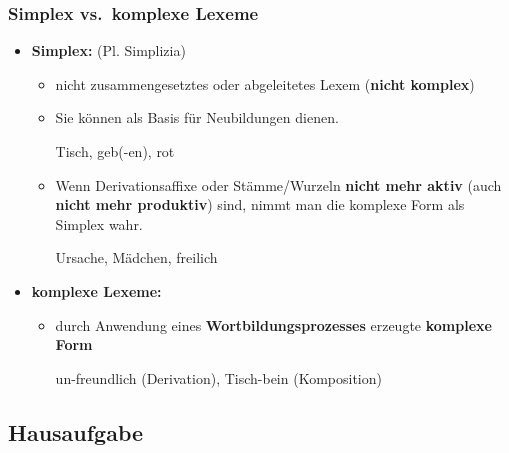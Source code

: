 \begin{frame}
\frametitle{Simplex vs.\ komplexe Lexeme}

\begin{itemize}
	\item \textbf{Simplex:} (Pl. Simplizia)
	
	\begin{itemize}
		\item nicht zusammengesetztes oder abgeleitetes Lexem (\textbf{nicht komplex})
		\item Sie können als Basis für Neubildungen dienen.
		
		\ea Tisch, geb(-en), rot
		\z 
		
		\item Wenn Derivationsaffixe oder Stämme/Wurzeln \textbf{nicht mehr aktiv} (auch \textbf{nicht mehr produktiv}) sind, nimmt man die komplexe Form als Simplex wahr.

		\ea Ursache, Mädchen, freilich
		\z 
	\end{itemize}

\pause 

	\item \textbf{komplexe Lexeme:}
	
	\begin{itemize}
		\item durch Anwendung eines \textbf{Wortbildungsprozesses} erzeugte \textbf{komplexe Form}
		
		\ea un-freundlich (Derivation), Tisch-bein (Komposition)
		\z 
	\end{itemize}
\end{itemize}

\end{frame}


\subsection{Hausaufgabe}
\frame{
	\frametitle{~}
	\tableofcontents[currentsection]
}

